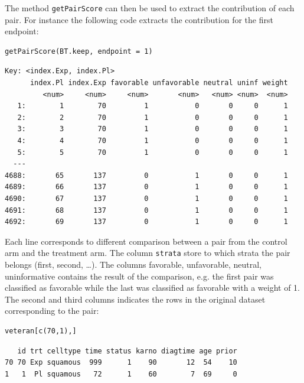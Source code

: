 \documentclass[12pt]{article}
\begin{document}
The method \texttt{getPairScore} can then be used to extract the contribution
of each pair. For instance the following code extracts the
contribution for the first endpoint:
\lstset{language=r,label= ,caption= ,captionpos=b,numbers=none}
\begin{lstlisting}
getPairScore(BT.keep, endpoint = 1)
\end{lstlisting}

\begin{verbatim}
Key: <index.Exp, index.Pl>
      index.Pl index.Exp favorable unfavorable neutral uninf weight
         <num>     <num>     <num>       <num>   <num> <num>  <num>
   1:        1        70         1           0       0     0      1
   2:        2        70         1           0       0     0      1
   3:        3        70         1           0       0     0      1
   4:        4        70         1           0       0     0      1
   5:        5        70         1           0       0     0      1
  ---                                                              
4688:       65       137         0           1       0     0      1
4689:       66       137         0           1       0     0      1
4690:       67       137         0           1       0     0      1
4691:       68       137         0           1       0     0      1
4692:       69       137         0           1       0     0      1
\end{verbatim}

Each line corresponds to different comparison between a pair from the
control arm and the treatment arm. The column \texttt{strata} store to which
strata the pair belongs (first, second, \ldots{}). The columns favorable,
unfavorable, neutral, uninformative contains the result of the
comparison, e.g. the first pair was classified as favorable while the
last was classified as favorable with a weight of 1. The second and
third columns indicates the rows in the original dataset corresponding
to the pair:
\lstset{language=r,label= ,caption= ,captionpos=b,numbers=none}
\begin{lstlisting}
veteran[c(70,1),]
\end{lstlisting}

\begin{verbatim}
   id trt celltype time status karno diagtime age prior
70 70 Exp squamous  999      1    90       12  54    10
1   1  Pl squamous   72      1    60        7  69     0
\end{verbatim}
\end{document}

